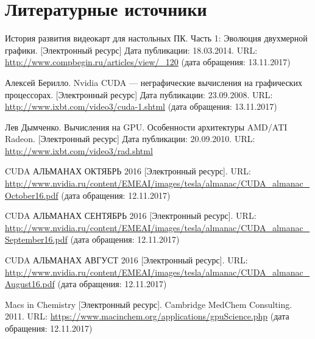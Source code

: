 \newpage
\section{Литературные источники}

\begin{thebibliography}{10}

История развития видеокарт для настольных ПК. Часть 1: Эволюция двухмерной графики. [Электронный ресурс] Дата публикации: 18.03.2014. URL: \url{http://www.compbegin.ru/articles/view/_120} (дата обращения: 13.11.2017)

Алексей Берилло. Nvidia CUDA --- неграфические вычисления на графических процессорах. [Электронный ресурс] Дата публикации: 23.09.2008. URL: \url{http://www.ixbt.com/video3/cuda-1.shtml} (дата обращения: 13.11.2017)

Лев Дымченко. Вычисления на GPU. Особенности архитектуры AMD/ATI Radeon. [Электронный ресурс] Дата публикации: 20.09.2010. URL: \url{http://www.ixbt.com/video3/rad.shtml}

CUDA\textsuperscript{\textregistered} АЛЬМАНАХ ОКТЯБРЬ 2016 [Электронный ресурс]. URL: \url{http://www.nvidia.ru/content/EMEAI/images/tesla/almanac/CUDA_almanac_October16.pdf} (дата обращения: 12.11.2017)

CUDA\textsuperscript{\textregistered} АЛЬМАНАХ СЕНТЯБРЬ 2016 [Электронный ресурс]. URL: \url{http://www.nvidia.ru/content/EMEAI/images/tesla/almanac/CUDA_almanac_September16.pdf} (дата обращения: 12.11.2017)

CUDA\textsuperscript{\textregistered} АЛЬМАНАХ АВГУСТ 2016 [Электронный ресурс]. URL: \url{http://www.nvidia.ru/content/EMEAI/images/tesla/almanac/CUDA_almanac_August16.pdf} (дата обращения: 12.11.2017)

Macs in Chemistry [Электронный ресурс]. Cambridge MedChem Consulting. 2011. URL: \url{https://www.macinchem.org/applications/gpuScience.php} (дата обращения: 12.11.2017)
\end{thebibliography}
